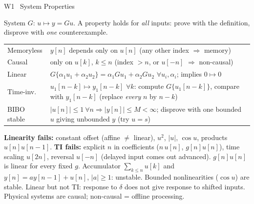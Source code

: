 \documentclass[a4paper,landscape]{article}
\newcommand{\sect}[1]{\par\vspace{1pt}\noindent\colorbox{secblue}{\parbox{\dimexpr\linewidth-2\fboxsep}{\color{white}\bfseries\fontsize{6.8}{7.6}\selectfont\strut #1}}\par\vspace{0.4pt}}
\begin{document}
\begin{multicols*}{4}
\sect{W1 \ System Properties}
System $G$: $u\mapsto y=Gu$. A property holds for \emph{all} inputs: prove with the definition, disprove with \emph{one} counterexample.\\
\begin{tabularx}{\linewidth}{@{}lY@{}}
Memoryless & $y[n]$ depends only on $u[n]$ (any other index $\Rightarrow$ memory)\\
Causal & only on $u[k]$, $k\le n$ (index $>n$, or $u[-n]$ $\Rightarrow$ non-causal)\\
Linear & $G\{\alpha_1u_1{+}\alpha_2u_2\}=\alpha_1Gu_1{+}\alpha_2Gu_2$ $\forall u_i,\alpha_i$; implies $0\mapsto0$\\
Time-inv. & $u_1[n{-}k]\mapsto y_1[n{-}k]$ $\forall k$: compute $G\{u_1[n{-}k]\}$, compare with $y_1[n{-}k]$ (replace \emph{every} $n$ by $n{-}k$)\\
BIBO stable & $|u[n]|{\le}1\ \forall n\Rightarrow|y[n]|{\le}M{<}\infty$; disprove with one bounded $u$ giving unbounded $y$ (try $u{=}s$)
\end{tabularx}
\textbf{Linearity fails:} constant offset (affine $\ne$ linear), $u^2$, $|u|$, $\cos u$, products $u[n]u[n{-}1]$. \textbf{TI fails:} explicit $n$ in coefficients ($n\,u[n]$, $g[n]u[n]$), time scaling $u[2n]$, reversal $u[-n]$ (delayed input comes out advanced). $g[n]u[n]$ is linear for every fixed $g$. Accumulator $\sum_{k\le n}u[k]$ and $y[n]{=}ay[n{-}1]{+}u[n]$, $|a|{\ge}1$: unstable. Bounded nonlinearities ($\cos u$) are stable. Linear but not TI: response to $\delta$ does not give response to shifted inputs. Physical systems are causal; non-causal = offline processing.


\end{multicols*}
\end{document}
